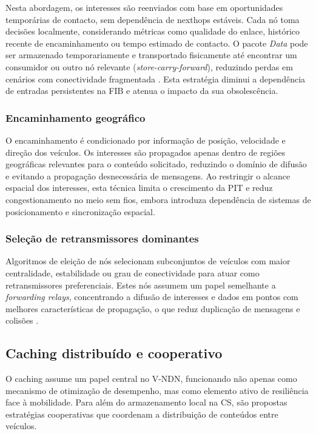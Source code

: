Nesta abordagem, os interesses são reenviados com base em oportunidades temporárias de contacto, sem dependência de nexthops estáveis. Cada nó toma decisões localmente, considerando métricas como qualidade do enlace, histórico recente de encaminhamento ou tempo estimado de contacto. O pacote \textit{Data} pode ser armazenado temporariamente e transportado fisicamente até encontrar um consumidor ou outro nó relevante (\textit{store-carry-forward}), reduzindo perdas em cenários com conectividade fragmentada \cite{rahman_data-centric_2021}. Esta estratégia diminui a dependência de entradas persistentes na FIB e atenua o impacto da sua obsolescência.

\subsubsection*{Encaminhamento geográfico}

O encaminhamento é condicionado por informação de posição, velocidade e direção dos veículos. Os interesses são propagados apenas dentro de regiões geográficas relevantes para o conteúdo solicitado, reduzindo o domínio de difusão e evitando a propagação desnecessária de mensagens. Ao restringir o alcance espacial dos interesses, esta técnica limita o crescimento da PIT e reduz congestionamento no meio sem fios, embora introduza dependência de sistemas de posicionamento e sincronização espacial.

\subsubsection*{Seleção de retransmissores dominantes}

Algoritmos de eleição de nós selecionam subconjuntos de veículos com maior centralidade, estabilidade ou grau de conectividade para atuar como retransmissores preferenciais. Estes nós assumem um papel semelhante a \textit{forwarding relays}, concentrando a difusão de interesses e dados em pontos com melhores características de propagação, o que reduz duplicação de mensagens e colisões \cite{khelifi_named_2020}.

\subsection{Caching distribuído e cooperativo}

O caching assume um papel central no \gls{V-NDN}, funcionando não apenas como mecanismo de otimização de desempenho, mas como elemento ativo de resiliência face à mobilidade. Para além do armazenamento local na \gls{CS}, são propostas estratégias cooperativas que coordenam a distribuição de conteúdos entre veículos.

